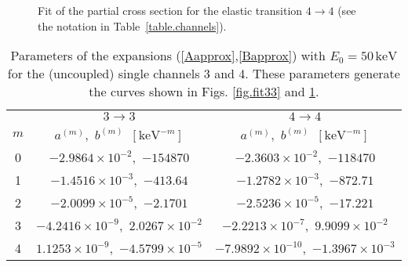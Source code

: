 \documentclass[12pt]{article}
\begin{document}
\begin{figure}
\centerline{}
\caption{\sf
Fit of the partial cross section for the elastic transition $4\to4$
(see the notation in Table~\ref{table.channels}).
}
\label{fig.fit44}
\end{figure}

\begin{table}
\begin{center}
\begin{tabular}{|c|c|c|}
\hline
    & $3\to3$ & $4\to4$\\
\cline{2-3}
$m$ &
$a^{(m)}$,\ $b^{(m)}$\ $[\mathrm{keV}^{-m}]$
&
$a^{(m)}$,\ $b^{(m)}$\ $[\mathrm{keV}^{-m}]$\\
\hline
0 & $        -2.9864\times10^{-2}$,\   $        -154870$ &
$        -2.3603\times10^{-2}$,\   $        -118470$\\
\hline
1 & $         -1.4516\times10^{-3}    $,\   $        -413.64$ &
$         -1.2782\times10^{-3}    $,\   $        -872.71$\\
\hline
2 & $         -2.0099\times10^{-5}    $,\   $        -2.1701$ &
$         -2.5236\times10^{-5}    $,\   $        -17.221$\\
\hline
3 & $         -4.2416\times10^{-9}    $,\   $         2.0267\times10^{-2}$ &
$         -2.2213\times10^{-7}    $,\   $         9.9099\times10^{-2}$\\
\hline
4 & $          1.1253\times10^{-9}    $,\   $  -4.5799\times10^{-5}$ &
$         -7.9892\times10^{-10}    $,\   $  -1.3967\times10^{-3}$\\
\hline
\end{tabular}
\end{center}
\caption{\sf
Parameters of the expansions (\ref{Aapprox},\ref{Bapprox}) with
$E_0=50\,\mathrm{keV}$ for the (uncoupled) single
channels 3 and 4. These parameters generate the curves shown in Figs.
\ref{fig.fit33} and \ref{fig.fit44}.
}
\label{table.parameters34}
\end{table}
\end{document}
